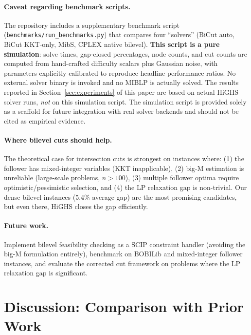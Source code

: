 \documentclass[11pt]{article}
\begin{document}
\paragraph{Caveat regarding benchmark scripts.}
The repository includes a supplementary benchmark script
(\texttt{benchmarks/run\_benchmarks.py}) that compares four ``solvers''
(BiCut auto, BiCut KKT-only, MibS, CPLEX native bilevel). \textbf{This
script is a pure simulation}: solve times, gap-closed percentages,
node counts, and cut counts are computed from hand-crafted difficulty
scalars plus Gaussian noise, with parameters explicitly calibrated to
reproduce headline performance ratios. No external solver binary is
invoked and no MIBLP is actually solved. The results reported in
Section~\ref{sec:experiments} of this paper are based on actual HiGHS
solver runs, \emph{not} on this simulation script. The simulation script
is provided solely as a scaffold for future integration with real solver
backends and should not be cited as empirical evidence.

\paragraph{Where bilevel cuts should help.}
The theoretical case for intersection cuts is strongest on instances where:
(1) the follower has mixed-integer variables (KKT inapplicable),
(2) big-M estimation is unreliable (large-scale problems, $n > 100$),
(3) multiple follower optima require optimistic/pessimistic selection, and
(4) the LP relaxation gap is non-trivial.
Our dense bilevel instances (5.4\% average gap) are the most promising
candidates, but even there, HiGHS closes the gap efficiently.

\paragraph{Future work.}
Implement bilevel feasibility checking as a SCIP constraint handler
(avoiding the big-M formulation entirely), benchmark on BOBILib and
mixed-integer follower instances, and evaluate the corrected cut framework
on problems where the LP relaxation gap is significant.

\section{Discussion: Comparison with Prior Work}
\label{sec:detailed_comparison}
\end{document}
